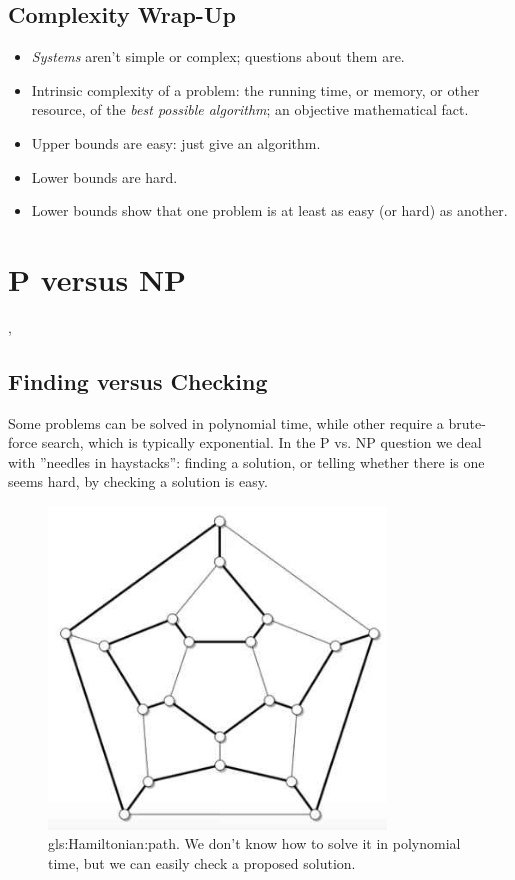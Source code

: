 \documentclass[]{article}
\begin{document}
\subsection{Complexity Wrap-Up}

\begin{itemize}
	\item \emph{Systems} aren't simple or complex; questions about them are.
	\item Intrinsic complexity of a problem: the running time, or memory, or other resource, of the \emph{best possible algorithm}; an objective mathematical fact.
	\item Upper bounds are easy: just give an algorithm.
	\item Lower bounds are hard.
	\item Lower bounds show that one problem is at least as easy (or hard) as another. 
\end{itemize}

\section{P versus NP}
\cite[Chapters 4-6]{moore2011nature}, \cite{sep-computability}

\subsection{Finding versus Checking}

Some problems can be solved in polynomial time, while other require a brute-force search, which is typically exponential. In the P vs. NP question we deal with ''needles in haystacks'': finding a solution, or telling whether there is one seems hard, by checking a solution is easy.

\begin{figure}[H]
	\begin{center}
		\caption[Hamiltonian path]{\gls{gls:Hamiltonian:path}. We don't know how to solve it in polynomial time, but we can easily check a proposed solution.}\label{fig:PNP1}
		\includegraphics[width=0.8\textwidth]{PNP1}
	\end{center}
\end{figure} 
\end{document}
